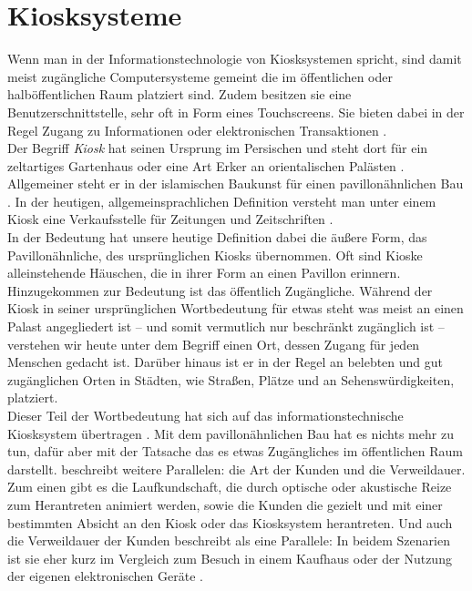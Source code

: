 \section{Kiosksysteme}
\label{section:kiosk}

Wenn man in der Informationstechnologie von Kiosksystemen spricht,
sind damit meist zugängliche Computersysteme gemeint die im öffentlichen oder halböffentlichen 
Raum platziert sind. Zudem besitzen sie eine Benutzerschnittstelle, sehr oft in Form
eines Touchscreens. Sie bieten dabei in der Regel Zugang zu Informationen 
oder elektronischen Transaktionen \cite{retailing}.\\

Der Begriff \emph{Kiosk} hat seinen Ursprung im Persischen und steht dort für
ein zeltartiges Gartenhaus oder eine Art Erker an orientalischen Palästen \cite{meyers}.
Allgemeiner steht er in der islamischen Baukunst für einen pavillonähnlichen Bau \cite{taschenlexikon}.
In der heutigen, allgemeinsprachlichen Definition versteht man unter einem Kiosk eine Verkaufsstelle
für Zeitungen und Zeitschriften \cite{taschenlexikon, meyers}.\\
In der Bedeutung hat unsere heutige Definition dabei die äußere Form, das Pavillonähnliche, 
des ursprünglichen Kiosks übernommen. Oft sind Kioske alleinstehende Häuschen, die in ihrer Form
an einen Pavillon erinnern. Hinzugekommen zur Bedeutung ist das öffentlich Zugängliche. Während der Kiosk 
in seiner ursprünglichen Wortbedeutung für etwas steht was meist an einen Palast angegliedert ist -- und 
somit vermutlich nur beschränkt zugänglich ist -- verstehen wir heute unter dem Begriff einen Ort, dessen Zugang
für jeden Menschen gedacht ist. Darüber hinaus ist er in der Regel an belebten und gut zugänglichen Orten 
in Städten, wie Straßen, Plätze und an Sehenswürdigkeiten, platziert.\\
Dieser Teil der Wortbedeutung hat sich auf das informationstechnische Kiosksystem übertragen \cite{multimediale}. Mit dem 
pavillonähnlichen Bau hat es nichts mehr zu tun, dafür aber mit der Tatsache das es etwas Zugängliches 
im öffentlichen Raum darstellt. \citeauthor{multimediale} beschreibt weitere Parallelen: die Art der Kunden und 
die Verweildauer. Zum einen gibt es die Laufkundschaft, die durch optische oder akustische Reize
zum Herantreten animiert werden, sowie die Kunden die gezielt und mit einer bestimmten Absicht an den Kiosk
oder das Kiosksystem herantreten. Und auch die Verweildauer der Kunden beschreibt \citeauthor{multimediale} als eine 
Parallele: In beidem Szenarien ist sie eher kurz im Vergleich zum Besuch in einem Kaufhaus oder der Nutzung der 
eigenen elektronischen Geräte \cite{multimediale}.\\


